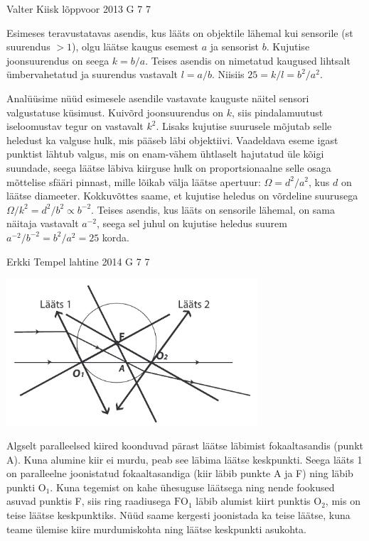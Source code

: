 \documentclass[11pt]{article}
\begin{document}
{%
{Valter Kiisk} %
{lõppvoor} %
{2013} %
{G 7} %
{7} %
{

\ifSolution
Esimeses teravustatavas asendis, kus lääts on objektile lähemal kui sensorile (st suurendus $>1$), olgu läätse kaugus esemest $a$ ja sensorist $b$. Kujutise joonsuurendus on seega $k=b/a$. Teises asendis on nimetatud kaugused lihtsalt ümbervahetatud ja suurendus vastavalt $l=a/b$. Niisiis $25=k/l=b^2/a^2$.

Analüüsime nüüd esimesele asendile vastavate kauguste näitel sensori valgustatuse küsimust. Kuivõrd joonsuurendus on $k$, siis pindalamuutust iseloomustav tegur on vastavalt $k^2$. Lisaks kujutise suurusele mõjutab selle heledust ka valguse hulk, mis pääseb läbi objektiivi. Vaadeldava eseme igast punktist lähtub valgus, mis on enam-vähem ühtlaselt hajutatud üle kõigi suundade, seega läätse läbiva kiirguse hulk on proportsionaalne selle osaga mõttelise sfääri pinnast, mille lõikab välja läätse apertuur: $\Omega=d^2/a^2$, kus $d$ on läätse diameeter. Kokkuvõttes saame, et kujutise heledus on võrdeline suurusega $\Omega/k^2=d^2/b^2\propto b^{-2}$. Teises asendis, kus lääts on sensorile lähemal, on sama näitaja vastavalt $a^{-2}$, seega sel juhul on kujutise heledus suurem $a^{-2}/b^{-2}=b^2/a^2=25$ korda.
\fi
}

{Erkki Tempel} %
{lahtine} %
{2014} %
{G 7} %
{7} %
{

\ifSolution
\begin{center}
\includegraphics[width=0.7\textwidth]{2014-lahg-07-optilineskeemlahendus}
\end{center}
Algselt paralleelsed kiired koonduvad pärast läätse läbimist fokaaltasandis (punkt A). Kuna alumine kiir ei murdu, peab see läbima läätse keskpunkti. Seega lääts 1 on paralleelne joonistatud fokaaltasandiga (kiir läbib punkte A ja F) ning läbib punkti $\text{O}_1$. Kuna tegemist on kahe ühesuguse läätsega ning nende fookused asuvad punktis F, siis ring raadiusega $\text{FO}_1$ läbib alumist kiirt punktis $\text{O}_2$, mis on teise läätse keskpunktiks. Nüüd saame kergesti joonistada ka teise läätse, kuna teame ülemise kiire murdumiskohta ning läätse keskpunkti asukohta.
\fi
}

}
\end{document}
